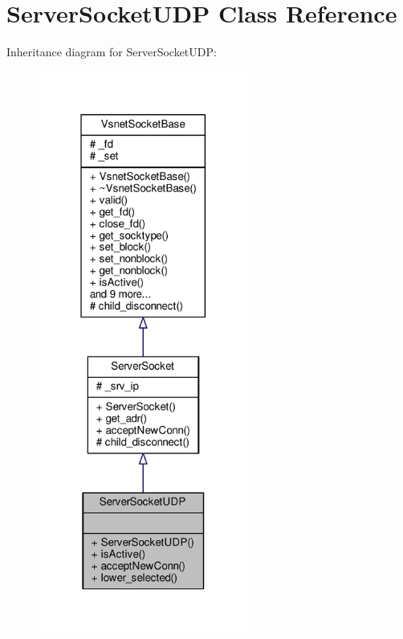 \hypertarget{classServerSocketUDP}{}\section{Server\+Socket\+U\+DP Class Reference}
\label{classServerSocketUDP}


Inheritance diagram for Server\+Socket\+U\+DP\+:
\nopagebreak
\begin{figure}[H]
\begin{center}
\leavevmode
\includegraphics[width=196pt]{db/d7a/classServerSocketUDP__inherit__graph}
\end{center}
\end{figure}


